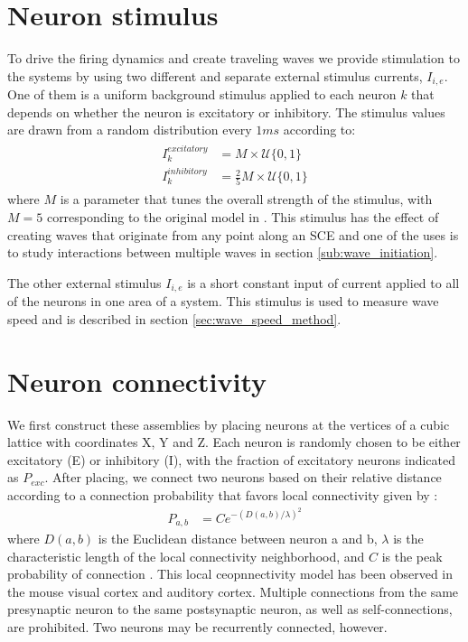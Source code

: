 \section{Neuron stimulus}
To drive the firing dynamics and create traveling waves we provide stimulation to the systems by using two different and separate external stimulus currents, $I_{i,e}$. 
One of them is a uniform background stimulus applied to each neuron $k$ that depends on whether the neuron is excitatory or inhibitory.
The stimulus values are drawn from a random distribution every $1 ms$ according to:
\begin{align}\label{eq:randomstim}
 \begin{split}
  I_k^{excitatory} &= M \times \mathcal{U}\{0,1 \} \\
  I_k^{inhibitory} &= \frac{2}{5} M \times \mathcal{U}\{0,1 \}
 \end{split}
\end{align}
where $M$ is a parameter that tunes the overall strength of the stimulus, with $M=5$ corresponding to the original model in \citep{izhikevich2003}. 
This stimulus has the effect of creating waves that originate from any point along an SCE and one of the uses is to study interactions between multiple waves in section \ref{sub:wave_initiation}.

The other external stimulus $I_{i,e}$ is a short constant input of current applied to all of the neurons in one area of a system.
This stimulus is used to measure wave speed and is described in section \ref{sec:wave_speed_method}.


\section{Neuron connectivity}
We first construct these assemblies by placing neurons at the vertices of a cubic lattice with coordinates X, Y and Z. 
Each neuron is  randomly chosen to be  either excitatory (E) or inhibitory (I), with the fraction of excitatory neurons indicated as $P_{exc}$.
After placing, we connect two neurons based on their relative distance according to a connection probability that favors local connectivity given by \citep{maass2002}: 
\begin{align}\label{eq:connectivity}
 P_{a,b} &= C e^{-(D(a,b)/\lambda)^2}
\end{align}
where $D(a,b)$ is the Euclidean distance between neuron a and b, $\lambda$ is the characteristic length of the local connectivity neighborhood, and $C$ is the peak probability of connection .
This local ceopnnectivity model has been observed in the mouse visual cortex\citep{Hellwig2000} and auditory cortex\citep{Levy2012}.
Multiple connections from the same presynaptic neuron to the same postsynaptic neuron, as well as self-connections, are prohibited.
Two neurons may be recurrently connected, however. 

